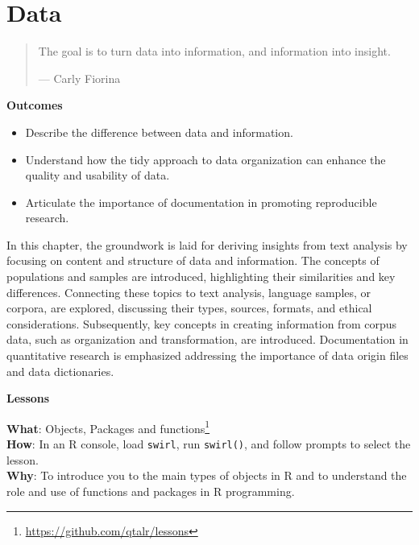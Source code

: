 \documentclass[
  letterpaper,
]{latex/krantz}
\providecommand{\tightlist}{%
  \setlength{\itemsep}{0pt}\setlength{\parskip}{0pt}}\usepackage{longtable,booktabs,array}
\theoremstyle{definition}
\theoremstyle{remark}
\DeclareRobustCommand{\href}[2]{#2\footnote{\url{#1}}}
\begin{document}
\chapter{Data}\label{sec-data-chapter}

\begin{quote}
The goal is to turn data into information, and information into insight.

--- Carly Fiorina
\end{quote}

\begin{tcolorbox}[enhanced jigsaw, toprule=.15mm, breakable, colback=white, opacityback=0, leftrule=.75mm, bottomrule=.15mm, colframe=quarto-callout-color-frame, left=2mm, arc=.35mm, rightrule=.15mm]

\textbf{ Outcomes}

\begin{itemize}
\tightlist
\item
  Describe the difference between data and information.
\item
  Understand how the tidy approach to data organization can enhance the
  quality and usability of data.
\item
  Articulate the importance of documentation in promoting reproducible
  research.
\end{itemize}

\end{tcolorbox}

In this chapter, the groundwork is laid for deriving insights from text
analysis by focusing on content and structure of data and information.
The concepts of populations and samples are introduced, highlighting
their similarities and key differences. Connecting these topics to text
analysis, language samples, or corpora, are explored, discussing their
types, sources, formats, and ethical considerations. Subsequently, key
concepts in creating information from corpus data, such as organization
and transformation, are introduced. Documentation in quantitative
research is emphasized addressing the importance of data origin files
and data dictionaries.

\begin{tcolorbox}[enhanced jigsaw, toprule=.15mm, breakable, colback=white, opacityback=0, leftrule=.75mm, bottomrule=.15mm, colframe=quarto-callout-color-frame, left=2mm, arc=.35mm, rightrule=.15mm]

\textbf{ Lessons}

\textbf{What}: \href{https://github.com/qtalr/lessons}{Objects, Packages
and functions}\\
\textbf{How}: In an R console, load \texttt{swirl}, run
\texttt{swirl()}, and follow prompts to select the lesson.\\
\textbf{Why}: To introduce you to the main types of objects in R and to
understand the role and use of functions and packages in R programming.

\end{tcolorbox}
\end{document}
